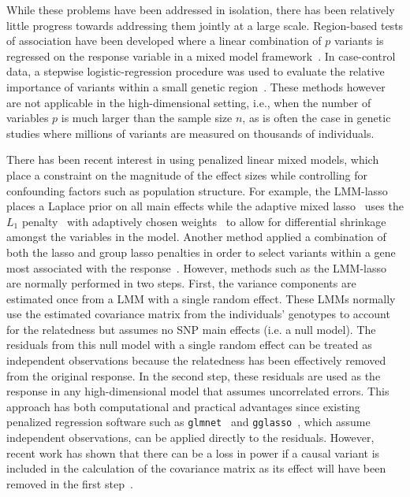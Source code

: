 \documentclass[10pt,letterpaper]{article}
\begin{document}
While these problems have been addressed in isolation, there has been relatively little progress towards addressing them jointly at a large scale.
Region-based tests of association have been developed where a linear combination of $p$ variants is regressed on the response variable in a mixed model framework~\cite{oualkacha2013adjusted}.
In case-control data, a stepwise logistic-regression procedure was used to evaluate the relative importance of variants within a small genetic region~\cite{cordell2002unified}.
These methods however are not applicable in the high-dimensional setting, i.e., when the number of variables $p$ is much larger than the sample size $n$, as is often the case in genetic studies where millions of variants are measured on thousands of individuals.

There has been recent interest in using penalized linear mixed models, which place a constraint on the magnitude of the effect sizes while controlling for confounding factors such as population structure.
For example, the LMM-lasso~\cite{rakitsch2013lasso} places a Laplace prior on all main effects while the adaptive mixed lasso~\cite{wang2011identifying} uses the $L_1$ penalty~\cite{tibshirani1996regression} with adaptively chosen weights~\cite{zou2006adaptive} to allow for differential shrinkage amongst the variables in the model.
Another method applied a combination of both the lasso and group lasso penalties in order to select variants within a gene most associated with the response~\cite{ding20142}.
However, methods such as the LMM-lasso are normally performed in two steps. First, the variance components are estimated once from a LMM with a single random effect. These LMMs normally use the estimated covariance matrix from the individuals' genotypes to account for the relatedness but assumes no SNP main effects (i.e. a null model).
The residuals from this null model with a single random effect can be treated as independent observations because the relatedness has been effectively removed from the original response.
In the second step, these residuals are used as the response in any high-dimensional model that assumes uncorrelated errors.
This approach has both computational and practical advantages since existing penalized regression software such as \texttt{glmnet}~\cite{friedman2010regularization} and \texttt{gglasso}~\cite{yang2015fast}, which assume independent observations, can be applied directly to the residuals.
However, recent work has shown that there can be a loss in power if a causal variant is included in the calculation of the covariance matrix as its effect will have been removed in the first step~\cite{oualkacha2013adjusted,yang2014advantages}.
\end{document}
